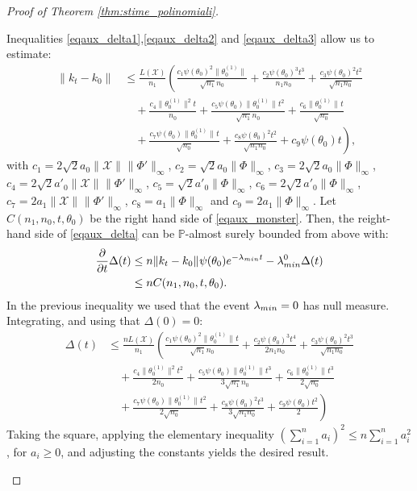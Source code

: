 \documentclass[10pt,a4paper]{amsart}
\newcommand{\X}{\mathcal{X}}
\newcommand{\lammin}{\lambda_{\textup{min}}}
\newcommand{\norm}[2]{
    \|#1\|_{#2}
}
\newcommand{\s}{\psi}
\begin{document}
\begin{proof}[Proof of Theorem \ref{thm:stime_polinomiali}]
\begin{itemize}
        Inequalities \eqref{eqaux_delta1},\eqref{eqaux_delta2} and \eqref{eqaux_delta3} allow us to estimate:
        \begin{align}
            \label{eqaux_monster}
            \norm{k_t-k_0}{}&\le \frac{L(\X)}{n_1}\left(\frac{c_1 \s(\theta_0)^2\norm{\theta^{(1)}_0}{}}{\sqrt{n_1}n_0}+\frac{c_2 \s(\theta_0)^3t^3}{n_1n_0}+\frac{c_3 \s(\theta_0)^2t^2}{\sqrt{n_1n_0}} \right.\\
            &\left.\quad +\frac{c_4 \norm{\theta^{(1)}_0}{}^2t}{n_0}+\frac{c_5 \s(\theta_0)\norm{\theta^{(1)}_0}{}t^2}{\sqrt{n_1}n_0}+\frac{c_6 \norm{\theta^{(1)}_0}{}t}{\sqrt{n_0}}\right.\\
            &\left.\quad +\frac{c_7 \s(\theta_0)\norm{\theta^{(1)}_0}{}t}{\sqrt{n_0}}+\frac{c_8 \s(\theta_0)^2t^2}{\sqrt{n_1n_0}}+c_9\s(\theta_0)t\right),
        \end{align}
        with $c_1 = 2\sqrt{2}a_0\norm{\X}{}\norm{\Phi'}{\infty}$,
$c_2 = \sqrt{2}a_0\norm{\Phi}{\infty}$,
$c_3 = 2\sqrt{2}a_0\norm{\Phi}{\infty}$,
$c_4 = 2\sqrt{2}a'_0\norm{\X}{}\norm{\Phi'}{\infty}$,
$c_5 = \sqrt{2}a'_0\norm{\Phi}{\infty}$,
$c_6 = 2\sqrt{2}a'_0\norm{\Phi}{\infty}$,
$c_7 = 2a_1\norm{\X}{}\norm{\Phi'}{\infty}$,
$c_8 = a_1\norm{\Phi}{\infty}$ and $c_9 = 2a_1\norm{\Phi}{\infty}$.
Let $C(n_1,n_0,t,\theta_0)$ be the right hand side of \eqref{eqaux_monster}.
Then, the reight-hand side of \eqref{eqaux_delta} can be $\mathbb P$-almost surely bounded from above with:
\begin{align}
    \frac{\partial}{\partial t} \Delta(t) &\le n\norm{k_t-k_0}{}\s(\theta_0)e^{-\lammin t} -\lammin^0\Delta(t) \\
    &\le nC(n_1,n_0,t,\theta_0).
\end{align}
In the previous inequality we used that the event $\lammin=0$ has null measure.
Integrating, and using that $\Delta(0)=0$:
\begin{align}
    \Delta(t) &\le \frac{nL(\X)}{n_1}\left(\frac{c_1 \s(\theta_0)^2\norm{\theta^{(1)}_0}{}t}{\sqrt{n_1}n_0}+\frac{c_2 \s(\theta_0)^3t^4}{2n_1n_0}+\frac{c_3 \s(\theta_0)^2t^3}{\sqrt{n_1n_0}}\right. \\
    &\left.\quad +\frac{c_4 \norm{\theta^{(1)}_0}{}^2t^2}{2n_0}+\frac{c_5 \s(\theta_0)\norm{\theta^{(1)}_0}{}t^3}{3\sqrt{n_1}n_0}+\frac{c_6 \norm{\theta^{(1)}_0}{}t^3}{2\sqrt{n_0}}\right.\\
    &\left.\quad +\frac{c_7 \s(\theta_0)\norm{\theta^{(1)}_0}{}t^2}{2\sqrt{n_0}}+\frac{c_8 \s(\theta_0)^2t^3}{3\sqrt{n_1n_0}}+\frac{c_9\s(\theta_0)t^2}{2}\right)
\end{align}
Taking the square, applying the elementary inequality $(\sum^n_{i=1}a_i)^2\le n\sum^n_{i=1}a_i^2$, for $a_i\ge 0$,
and adjusting the constants yields the desired result.
    \end{itemize}
\end{proof}
\end{document}
